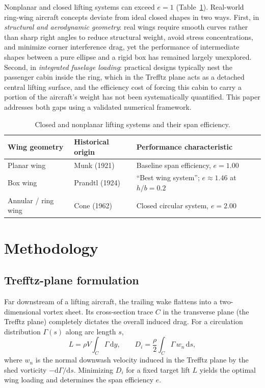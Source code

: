 \documentclass[11pt]{article}
\begin{document}
Nonplanar and closed lifting systems can exceed $e=1$
(Table~\ref{tab:history}). Real-world ring-wing aircraft concepts deviate
from ideal closed shapes in two ways. First, in \emph{structural and
aerodynamic geometry}: real wings require smooth curves rather than sharp
right angles to reduce structural weight, avoid stress concentrations, and
minimize corner interference drag, yet the performance of intermediate
shapes between a pure ellipse and a rigid box has remained largely
unexplored. Second, in \emph{integrated fuselage loading}: practical
designs typically nest the passenger cabin inside the ring, which in the
Trefftz plane acts as a detached central lifting surface, and the
efficiency cost of forcing this cabin to carry a portion of the aircraft's
weight has not been systematically quantified. This paper addresses both
gaps using a validated numerical framework.

\begin{table}[htb]
\centering
\caption{Closed and nonplanar lifting systems and their span efficiency.}
\label{tab:history}
\begin{tabular}{lll}
\toprule
Wing geometry & Historical origin & Performance characteristic \\
\midrule
Planar wing & Munk (1921) & Baseline span efficiency, $e=1.00$ \\
Box wing & Prandtl (1924) & ``Best wing system''; $e\approx1.46$ at $h/b=0.2$ \\
Annular / ring wing & Cone (1962) & Closed circular system, $e=2.00$ \\
\bottomrule
\end{tabular}
\end{table}

\section{Methodology}

\subsection{Trefftz-plane formulation}
Far downstream of a lifting aircraft, the trailing wake flattens into a
two-dimensional vortex sheet. Its cross-section trace $C$ in the transverse
plane (the Trefftz plane) completely dictates the overall induced drag. For
a circulation distribution $\Gamma(s)$ along arc length $s$,
\begin{equation}
L = \rho V \int_C \Gamma \,\mathrm{d}y,
\qquad
D_i = \frac{\rho}{2} \int_C \Gamma\, w_n \,\mathrm{d}s,
\end{equation}
where $w_n$ is the normal downwash velocity induced in the Trefftz plane by
the shed vorticity $-\mathrm{d}\Gamma/\mathrm{d}s$. Minimizing $D_i$ for a
fixed target lift $L$ yields the optimal wing loading and determines the
span efficiency $e$.
\end{document}
